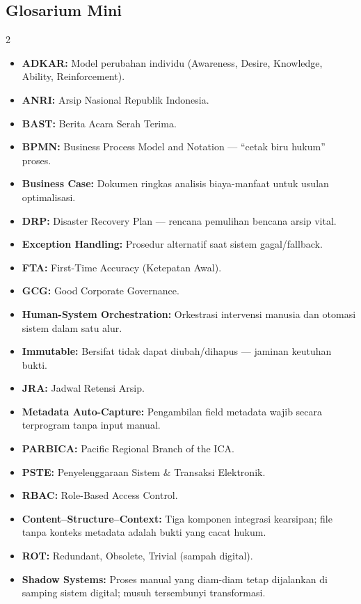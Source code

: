 \documentclass[11pt,a4paper]{article}
\begin{document}
\subsection{Glosarium Mini}
\begin{multicols}{2}
\small
\begin{itemize}[leftmargin=*, nosep]
    \item \textbf{ADKAR:} Model perubahan individu (Awareness, Desire, Knowledge, Ability, Reinforcement).
    \item \textbf{ANRI:} Arsip Nasional Republik Indonesia.
    \item \textbf{BAST:} Berita Acara Serah Terima.
    \item \textbf{BPMN:} Business Process Model and Notation --- ``cetak biru hukum'' proses.
    \item \textbf{Business Case:} Dokumen ringkas analisis biaya-manfaat untuk usulan optimalisasi.
    \item \textbf{DRP:} Disaster Recovery Plan --- rencana pemulihan bencana arsip vital.
    \item \textbf{Exception Handling:} Prosedur alternatif saat sistem gagal/fallback.
    \item \textbf{FTA:} First-Time Accuracy (Ketepatan Awal).
    \item \textbf{GCG:} Good Corporate Governance.
    \item \textbf{Human-System Orchestration:} Orkestrasi intervensi manusia dan otomasi sistem dalam satu alur.
    \item \textbf{Immutable:} Bersifat tidak dapat diubah/dihapus --- jaminan keutuhan bukti.
    \item \textbf{JRA:} Jadwal Retensi Arsip.
    \item \textbf{Metadata Auto-Capture:} Pengambilan field metadata wajib secara terprogram tanpa input manual.
    \item \textbf{PARBICA:} Pacific Regional Branch of the ICA.
    \item \textbf{PSTE:} Penyelenggaraan Sistem \& Transaksi Elektronik.
    \item \textbf{RBAC:} Role-Based Access Control.
    \item \textbf{Content--Structure--Context:} Tiga komponen integrasi kearsipan; file tanpa konteks metadata adalah bukti yang cacat hukum.
    \item \textbf{ROT:} Redundant, Obsolete, Trivial (sampah digital).
    \item \textbf{Shadow Systems:} Proses manual yang diam-diam tetap dijalankan di samping sistem digital; musuh tersembunyi transformasi.

\end{itemize}
\end{multicols}
\end{document}
